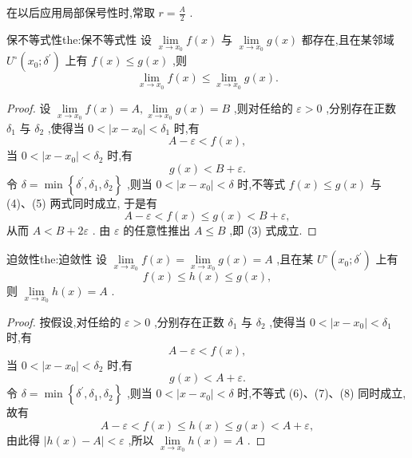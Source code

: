 \begin{remark}
在以后应用局部保号性时,常取 \(r = \frac{A}{2}\) .
\end{remark}


\begin{theorem}{保不等式性}{the:保不等式性}
设 \(\mathop{\lim }\limits_{{x \rightarrow  {x}_{0}}}f\left( x\right)\) 与 \(\mathop{\lim }\limits_{{x \rightarrow  {x}_{0}}}g\left( x\right)\) 都存在,且在某邻域 \({U}^{ \circ  }\left( {{x}_{0};{\delta }^{\prime }}\right)\) 上有 \(f\left( x\right)  \leq  g\left( x\right)\) ,则
\[
\mathop{\lim }\limits_{{x \rightarrow  {x}_{0}}}f\left( x\right)  \leq  \mathop{\lim }\limits_{{x \rightarrow  {x}_{0}}}g\left( x\right) . \tag{3}
\]
\end{theorem}

\begin{proof}
设 \(\mathop{\lim }\limits_{{x \rightarrow  {x}_{0}}}f\left( x\right)  = A,\mathop{\lim }\limits_{{x \rightarrow  {x}_{0}}}g\left( x\right)  = B\) ,则对任给的 \(\varepsilon  > 0\) ,分别存在正数 \({\delta }_{1}\) 与 \({\delta }_{2}\) ,使得当 \(0 < \left| {x - {x}_{0}}\right|  < {\delta }_{1}\) 时,有
\[
A - \varepsilon  < f\left( x\right) , \tag{4}
\]
当 \(0 < \left| {x - {x}_{0}}\right|  < {\delta }_{2}\) 时,有
\[
g\left( x\right)  < B + \varepsilon . \tag{5}
\]
令 \(\delta  = \min \left\{  {{\delta }^{\prime },{\delta }_{1},{\delta }_{2}}\right\}\) ,则当 \(0 < \left| {x - {x}_{0}}\right|  < \delta\) 时,不等式 \(f\left( x\right)  \leq  g\left( x\right)\) 与 (4)、(5) 两式同时成立, 于是有
\[
A - \varepsilon  < f\left( x\right)  \leq  g\left( x\right)  < B + \varepsilon ,
\]
从而 \(A < B + {2\varepsilon }\) . 由 \(\varepsilon\) 的任意性推出 \(A \leq  B\) ,即 (3) 式成立.
\end{proof}


\begin{theorem}{迫敛性}{the:迫敛性}
设 \(\mathop{\lim }\limits_{{x \rightarrow  {x}_{0}}}f\left( x\right)  = \mathop{\lim }\limits_{{x \rightarrow  {x}_{0}}}g\left( x\right)  = A\) ,且在某 \({U}^{ \circ  }\left( {{x}_{0};{\delta }^{\prime }}\right)\) 上有
\[
f\left( x\right)  \leq  h\left( x\right)  \leq  g\left( x\right) , \tag{6}
\]
则 \(\mathop{\lim }\limits_{{x \rightarrow  {x}_{0}}}h\left( x\right)  = A\) .
\end{theorem}

\begin{proof}
按假设,对任给的 \(\varepsilon  > 0\) ,分别存在正数 \({\delta }_{1}\) 与 \({\delta }_{2}\) ,使得当 \(0 < \left| {x - {x}_{0}}\right|  < {\delta }_{1}\) 时,有
\[
A - \varepsilon  < f\left( x\right) , \tag{7}
\]
当 \(0 < \left| {x - {x}_{0}}\right|  < {\delta }_{2}\) 时,有
\[
g\left( x\right)  < A + \varepsilon . \tag{8}
\]
令 \(\delta  = \min \left\{  {{\delta }^{\prime },{\delta }_{1},{\delta }_{2}}\right\}\) ,则当 \(0 < \left| {x - {x}_{0}}\right|  < \delta\) 时,不等式 (6)、(7)、(8) 同时成立,故有
\[
A - \varepsilon  < f\left( x\right)  \leq  h\left( x\right)  \leq  g\left( x\right)  < A + \varepsilon ,
\]
由此得 \(\left| {h\left( x\right)  - A}\right|  < \varepsilon\) ,所以 \(\mathop{\lim }\limits_{{x \rightarrow  {x}_{0}}}h\left( x\right)  = A\) .
\end{proof}


